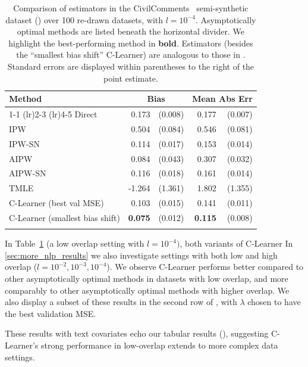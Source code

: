 \begin{table}[t]
\vspace{-1.5cm}
\centering
\footnotesize
\begin{tabular}{lrrrr}
\toprule
Method & \multicolumn{2}{c}{Bias} & \multicolumn{2}{c}{Mean Abs Err} \\ 
\cmidrule(lr){1-1}
\cmidrule(lr){2-3}
\cmidrule(lr){4-5}
Direct & 0.173 & (0.008) & 0.177 & (0.007) \\
IPW & 0.504 & (0.084) & 0.546 & (0.081) \\
IPW-SN & 0.114 & (0.017) & 0.153 & (0.014) \\
\greymidrule
AIPW & 0.084 & (0.043) & 0.307 & (0.032) \\
AIPW-SN & 0.116 & (0.018) & 0.161 & (0.014) \\
TMLE & -1.264 & (1.361) & 1.802 & (1.355) \\
C-Learner (best val MSE) & 0.103 & (0.015) & 0.141 & (0.011) \\
C-Learner (smallest bias shift) & \textbf{0.075} & (0.012) & \textbf{0.115} & (0.008) \\
\bottomrule
\vspace{0.05em}
\end{tabular}

\caption{Comparison of estimators in the CivilComments~\citep{civilcomments} semi-synthetic dataset () over 100 re-drawn datasets, with $l=10^{-4}$. Asymptotically optimal methods are listed beneath the horizontal divider. We highlight the best-performing method in \textbf{bold}. Estimators (besides the ``smallest bias shift'' C-Learner) are analogous to those in . Standard errors are displayed within parentheses to the right of the point estimate.}
    \label{tab:LLM_results}
\end{table}
In Table~\ref{tab:LLM_results} (a low overlap setting with $l=10^{-4})$, both variants of C-Learner %
In \cref{sec:more_nlp_results} we also investigate settings with both low and high overlap ($l=10^{-2},10^{-3},10^{-4}$). We observe C-Learner performs better compared to other asymptotically optimal methods in datasets with low overlap, and more comparably to other asymptotically optimal methods with higher overlap. 
We also display a subset of these results in the second row of , with 
$\lambda$ chosen to have the best validation MSE. 


 These results with text covariates echo our tabular results (), %
suggesting C-Learner's strong performance in low-overlap extends to more complex data settings. 
